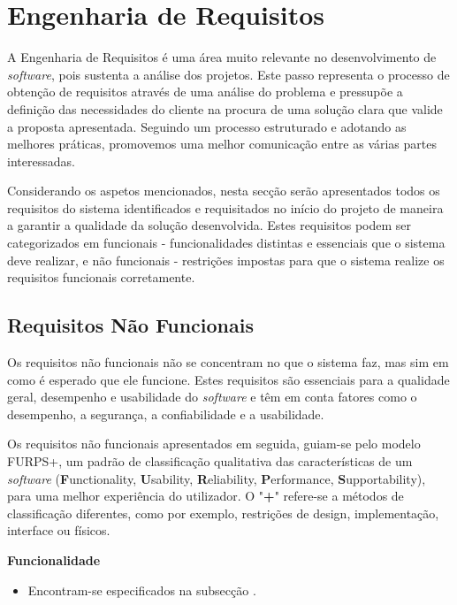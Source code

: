 \section{Engenharia de Requisitos}

A Engenharia de Requisitos é uma área muito relevante no desenvolvimento de \textit{software}, pois 
sustenta a análise dos projetos. Este passo representa o processo de obtenção de requisitos através 
de uma análise do problema e pressupõe a definição das necessidades do cliente na procura de uma 
solução clara que valide a proposta apresentada. Seguindo um processo estruturado e adotando as 
melhores práticas, promovemos uma melhor comunicação entre as várias partes interessadas.

Considerando os aspetos mencionados, nesta secção serão apresentados todos os 
requisitos do sistema identificados e requisitados no início do projeto de maneira a garantir a 
qualidade da solução desenvolvida. Estes requisitos podem ser categorizados em funcionais - 
funcionalidades distintas e essenciais que o sistema deve realizar, e não funcionais - 
restrições impostas para que o sistema realize os requisitos funcionais corretamente.

\subsection{Requisitos Não Funcionais}

Os requisitos não funcionais não se concentram no que o sistema faz, mas sim em como é esperado que
ele funcione. Estes requisitos são essenciais para a qualidade geral, desempenho e usabilidade do 
\textit{software} e têm em conta fatores como o desempenho, a segurança, a confiabilidade e a 
usabilidade.

Os requisitos não funcionais apresentados em seguida, guiam-se pelo modelo FURPS+, um padrão de 
classificação qualitativa das características de um \textit{software} (\textbf{F}unctionality, 
\textbf{U}sability, \textbf{R}eliability, \textbf{P}erformance, \textbf{S}upportability), para uma 
melhor experiência do utilizador. O "\textbf{+}" refere-se a métodos de classificação diferentes, 
como por exemplo, restrições de design, implementação, interface ou físicos.

\vspace{5mm}

\textbf{Funcionalidade}
\begin{itemize}
  \item Encontram-se especificados na subsecção .
\end{itemize}

